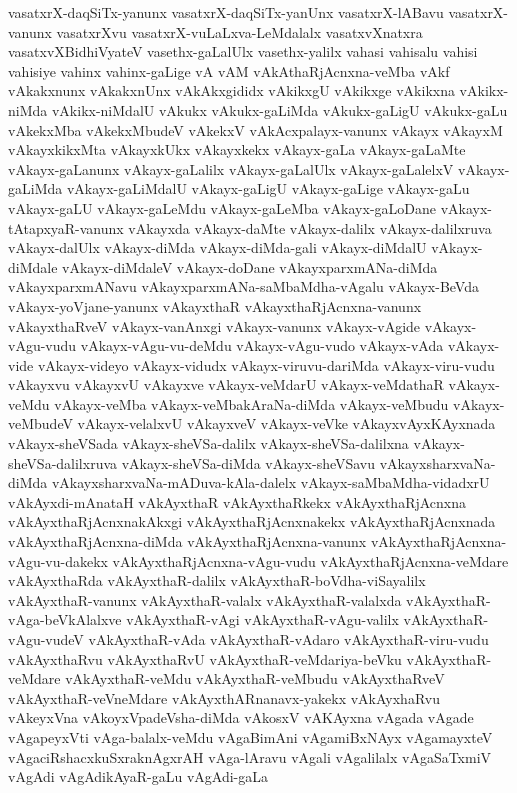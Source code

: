 {vasatxrX-daqSiTx-yanunx
vasatxrX-daqSiTx-yanUnx
vasatxrX-lABavu
vasatxrX-vanunx
vasatxrXvu
vasatxrX-vuLaLxva-LeMdalalx
vasatxvXnatxra
vasatxvXBidhiVyateV
vasethx-gaLalUlx
vasethx-yalilx
vahasi
vahisalu
vahisi
vahisiye
vahinx
vahinx-gaLige
vA
vAM
vAkAthaRjAcnxna-veMba
vAkf
vAkakxnunx
vAkakxnUnx
vAkAkxgididx
vAkikxgU
vAkikxge
vAkikxna
vAkikx-niMda
vAkikx-niMdalU
vAkukx
vAkukx-gaLiMda
vAkukx-gaLigU
vAkukx-gaLu
vAkekxMba
vAkekxMbudeV
vAkekxV
vAkAcxpalayx-vanunx
vAkayx
vAkayxM
vAkayxkikxMta
vAkayxkUkx
vAkayxkekx
vAkayx-gaLa
vAkayx-gaLaMte
vAkayx-gaLanunx
vAkayx-gaLalilx
vAkayx-gaLalUlx
vAkayx-gaLalelxV
vAkayx-gaLiMda
vAkayx-gaLiMdalU
vAkayx-gaLigU
vAkayx-gaLige
vAkayx-gaLu
vAkayx-gaLU
vAkayx-gaLeMdu
vAkayx-gaLeMba
vAkayx-gaLoDane
vAkayx-tAtapxyaR-vanunx
vAkayxda
vAkayx-daMte
vAkayx-dalilx
vAkayx-dalilxruva
vAkayx-dalUlx
vAkayx-diMda
vAkayx-diMda-gali
vAkayx-diMdalU
vAkayx-diMdale
vAkayx-diMdaleV
vAkayx-doDane
vAkayxparxmANa-diMda
vAkayxparxmANavu
vAkayxparxmANa-saMbaMdha-vAgalu
vAkayx-BeVda
vAkayx-yoVjane-yanunx
vAkayxthaR
vAkayxthaRjAcnxna-vanunx
vAkayxthaRveV
vAkayx-vanAnxgi
vAkayx-vanunx
vAkayx-vAgide
vAkayx-vAgu-vudu
vAkayx-vAgu-vu-deMdu
vAkayx-vAgu-vudo
vAkayx-vAda
vAkayx-vide
vAkayx-videyo
vAkayx-vidudx
vAkayx-viruvu-dariMda
vAkayx-viru-vudu
vAkayxvu
vAkayxvU
vAkayxve
vAkayx-veMdarU
vAkayx-veMdathaR
vAkayx-veMdu
vAkayx-veMba
vAkayx-veMbakAraNa-diMda
vAkayx-veMbudu
vAkayx-veMbudeV
vAkayx-velalxvU
vAkayxveV
vAkayx-veVke
vAkayxvAyxKAyxnada
vAkayx-sheVSada
vAkayx-sheVSa-dalilx
vAkayx-sheVSa-dalilxna
vAkayx-sheVSa-dalilxruva
vAkayx-sheVSa-diMda
vAkayx-sheVSavu
vAkayxsharxvaNa-diMda
vAkayxsharxvaNa-mADuva-kAla-dalelx
vAkayx-saMbaMdha-vidadxrU
vAkAyxdi-mAnataH
vAkAyxthaR
vAkAyxthaRkekx
vAkAyxthaRjAcnxna
vAkAyxthaRjAcnxnakAkxgi
vAkAyxthaRjAcnxnakekx
vAkAyxthaRjAcnxnada
vAkAyxthaRjAcnxna-diMda
vAkAyxthaRjAcnxna-vanunx
vAkAyxthaRjAcnxna-vAgu-vu-dakekx
vAkAyxthaRjAcnxna-vAgu-vudu
vAkAyxthaRjAcnxna-veMdare
vAkAyxthaRda
vAkAyxthaR-dalilx
vAkAyxthaR-boVdha-viSayalilx
vAkAyxthaR-vanunx
vAkAyxthaR-valalx
vAkAyxthaR-valalxda
vAkAyxthaR-vAga-beVkAlalxve
vAkAyxthaR-vAgi
vAkAyxthaR-vAgu-valilx
vAkAyxthaR-vAgu-vudeV
vAkAyxthaR-vAda
vAkAyxthaR-vAdaro
vAkAyxthaR-viru-vudu
vAkAyxthaRvu
vAkAyxthaRvU
vAkAyxthaR-veMdariya-beVku
vAkAyxthaR-veMdare
vAkAyxthaR-veMdu
vAkAyxthaR-veMbudu
vAkAyxthaRveV
vAkAyxthaR-veVneMdare
vAkAyxthARnanavx-yakekx
vAkAyxhaRvu
vAkeyxVna
vAkoyxVpadeVsha-diMda
vAkosxV
vAKAyxna
vAgada
vAgade
vAgapeyxVti
vAga-balalx-veMdu
vAgaBimAni
vAgamiBxNAyx
vAgamayxteV
vAgaciRshacxkuSxraknAgxrAH
vAga-lAravu
vAgali
vAgalilalx
vAgaSaTxmiV
vAgAdi
vAgAdikAyaR-gaLu
vAgAdi-gaLa
}
